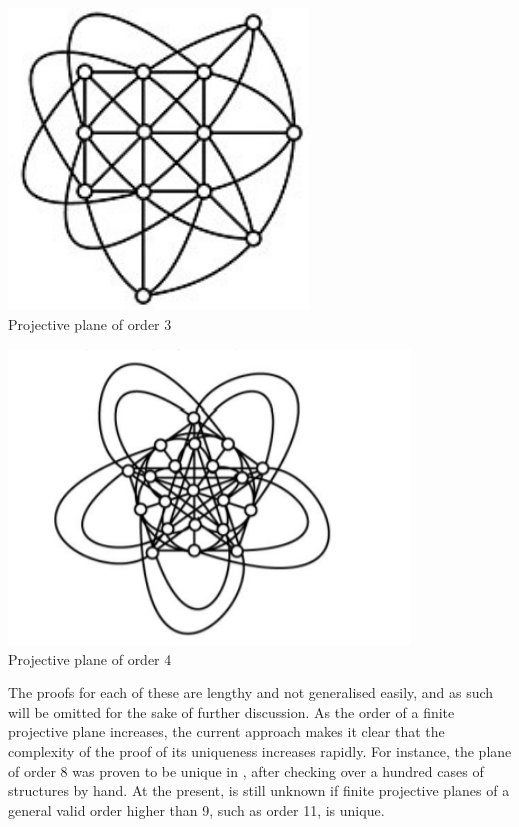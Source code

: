 \documentclass{report}
\theoremstyle{definition}\newtheorem*{definition}{Definition}
\theoremstyle{definition}\newtheorem*{example}{Example}
\theoremstyle{remark}\newtheorem*{remark}{Remark}
\begin{document}
\begin{minipage}{0.5\textwidth}
\begin{center}
\includegraphics[width=0.6\textwidth]{figures/order_3.jpg} \\
Projective plane of order 3
\end{center}
\end{minipage}
\begin{minipage}{0.5\textwidth}
\begin{center}
\includegraphics[width=0.8\textwidth]{figures/order_4.jpg} \\
Projective plane of order 4
\end{center}
\end{minipage}

The proofs for each of these are lengthy and not generalised easily, and as such will be omitted for the sake of further discussion. As the order of a finite projective plane increases, the current approach makes it clear that the complexity of the proof of its uniqueness increases rapidly. For instance, the plane of order 8 was proven to be unique in \cite{order8}, after checking over a hundred cases of structures by hand. At the present, is still unknown if finite projective planes of a general valid order higher than 9, such as order 11, is unique.
\end{document}
